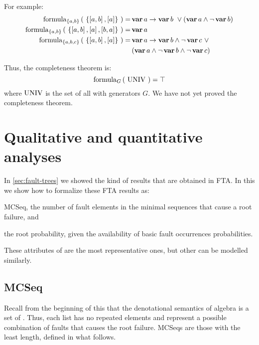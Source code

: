 For example:
\begin{align}
\formulaof{\left\{ \listsin{a,b}, \listsin{a} \right\}}{\left\{a,b\right\}} = &
\xbefore{\var{a}}{\var{b}} ~\lor  
	\left( \var{a} \land \lnot \var{b}  \right)\nonumber\\
\formulaof{\left\{ \listsin{a,b}, \listsin{a}, \listsin{b,a} \right\}}{\left\{a,b\right\}} = &
\var{a}\nonumber\\
\formulaof{\left\{ \listsin{a,b}, \listsin{a} \right\}}{\left\{a,b,c\right\}} = &
\xbefore{\var{a}}{\var{b}} \land \lnot \var{c} ~\lor \nonumber\\
	&\left( \var{a} \land \lnot \var{b} \land \lnot \var{c} \right)
\nonumber
\end{align}

Thus, the completeness theorem is:
\begin{equation}
\formulaof{\UNIV	}{G} = \top 
\end{equation}
%
where $\UNIV$ is the set of all \distinctlists with generators $G$.
We have not yet proved the completeness theorem.




\section{Qualitative and quantitative analyses}
\label{sec:qualitative-quantitative-analyses}

In \cref{sec:fault-trees} we showed the kind of results that are obtained in \ac{FTA}.
In this  we show how to formalize these \ac{FTA} results as: 
\begin{alineasinline}
  \item \ac{MCSeq}, the number of fault elements in the minimal sequences that cause a root failure, and 
  \item the root probability, given the availability of basic fault occurrences probabilities.
\end{alineasinline}
%
These attributes of  are the most representative ones, but other can be modelled similarly.

\subsection{\Acl{MCSeq}}

Recall from the beginning of this  that the denotational semantics of \ac{algebra} is a set of \distinctlists.
Thus, each list has no repeated elements and represent a possible combination of faults that causes the root failure.
\Acp{MCSeq} are those \distinctlists with the least length, defined in what follows.

